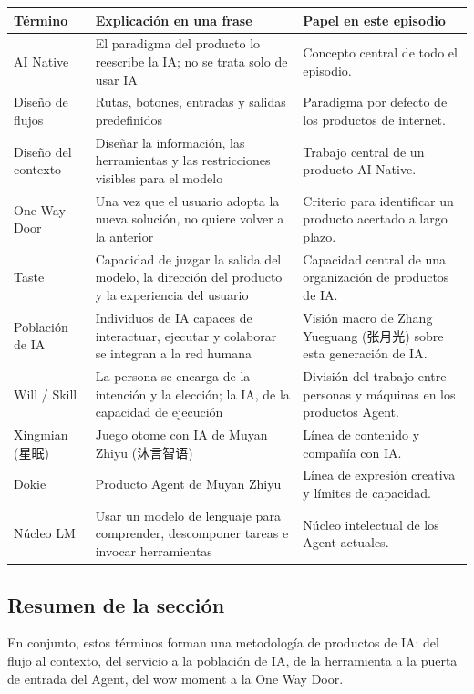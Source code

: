 \documentclass[a4paper]{article}
\begin{document}
\begin{longtable}{p{}p{}p{}}
\toprule
Término & Explicación en una frase & Papel en este episodio \\
\midrule
AI Native & El paradigma del producto lo reescribe la IA; no se trata solo de usar IA & Concepto central de todo el episodio. \\
Diseño de flujos & Rutas, botones, entradas y salidas predefinidos & Paradigma por defecto de los productos de internet. \\
Diseño del contexto & Diseñar la información, las herramientas y las restricciones visibles para el modelo & Trabajo central de un producto AI Native. \\
One Way Door & Una vez que el usuario adopta la nueva solución, no quiere volver a la anterior & Criterio para identificar un producto acertado a largo plazo. \\
Taste & Capacidad de juzgar la salida del modelo, la dirección del producto y la experiencia del usuario & Capacidad central de una organización de productos de IA. \\
Población de IA & Individuos de IA capaces de interactuar, ejecutar y colaborar se integran a la red humana & Visión macro de Zhang Yueguang (张月光) sobre esta generación de IA. \\
Will / Skill & La persona se encarga de la intención y la elección; la IA, de la capacidad de ejecución & División del trabajo entre personas y máquinas en los productos Agent. \\
Xingmian (星眠) & Juego otome con IA de Muyan Zhiyu (沐言智语) & Línea de contenido y compañía con IA. \\
Dokie & Producto Agent de Muyan Zhiyu & Línea de expresión creativa y límites de capacidad. \\
Núcleo LM & Usar un modelo de lenguaje para comprender, descomponer tareas e invocar herramientas & Núcleo intelectual de los Agent actuales. \\
\bottomrule
\end{longtable}

\subsection{Resumen de la sección}

En conjunto, estos términos forman una metodología de productos de IA: del flujo al contexto, del servicio a la población de IA, de la herramienta a la puerta de entrada del Agent, del wow moment a la One Way Door.
\end{document}
